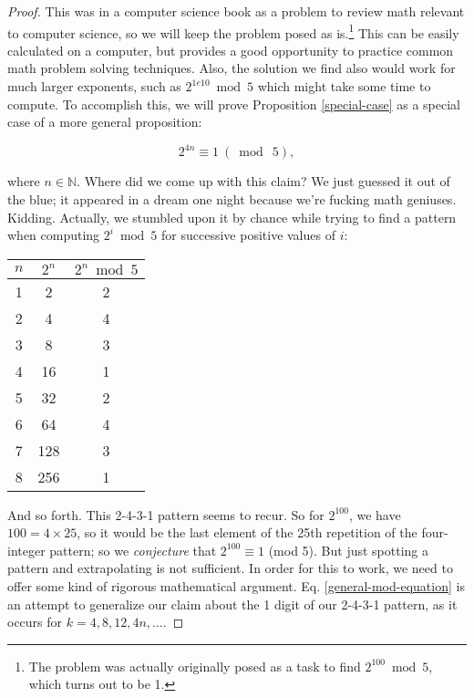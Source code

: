 \documentclass{article}
\theoremstyle{definition}
\begin{document}
\begin{proof}
This was in a computer science book as a problem to review math relevant to computer science, so we will keep the problem posed as is.\footnote{The problem was actually originally posed as a task to find $2^{100} \bmod 5$, which turns out to be 1.} This can be easily calculated on a computer, but provides a good opportunity to practice common math problem solving techniques. Also, the solution we find also would work for much larger exponents, such as $2^{1e10} \bmod 5$ which might take some time to compute. To accomplish this, we will prove Proposition \ref{special-case} as a special case of a more general proposition:

\begin{equation} \label{general-mod-equation}
2^{4n} \equiv 1 \ (\bmod \ 5),
\end{equation}

where $n \in \mathbb{N}$. Where did we come up with this claim? We just guessed it out of the blue; it appeared in a dream one night because we're fucking math geniuses. Kidding. Actually, we stumbled upon it by chance while trying to find a pattern when computing $2^{i} \bmod 5$ for successive positive values of $i$:

\begin{center}
\begin{tabular}{|c|c|c|}
\hline
$n$ & $2^n$ & $2^n \bmod 5$ \\
\hline
1 & 2 & 2 \\
2 & 4 & 4 \\
3 & 8 & 3 \\
4 & 16 & 1 \\
5 & 32 & 2 \\
6 & 64 & 4 \\
7 & 128 & 3 \\
8 & 256 & 1 \\
\hline
\end{tabular}
\end{center}

And so forth. This 2-4-3-1 pattern seems to recur. So for $2^{100}$, we have $100 = 4 \times 25$, so it would be the last element of the 25th repetition of the four-integer pattern; so we \textit{conjecture} that $2^{100} \equiv 1$ (mod 5). But just spotting a pattern and extrapolating is not sufficient. In order for this to work, we need to offer some kind of rigorous mathematical argument. 
Eq. \ref{general-mod-equation} is an attempt to generalize our claim about the 1 digit of our 2-4-3-1 pattern, as it occurs for $k = 4, 8, 12, 4n, \dots$.


\end{proof}
\end{document}

